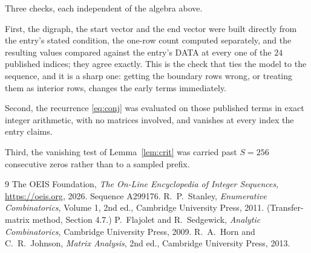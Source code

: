 \documentclass[11pt,a4paper]{article}
\theoremstyle{plain}
\theoremstyle{definition}
\begin{document}
Three checks, each independent of the algebra above.

First, the digraph, the start vector and the end vector were built directly from the
entry's stated condition, the one-row count computed separately, and the resulting values
compared against the entry's DATA at every one of the $24$ published indices; they
agree exactly. This is the check that ties the model to the sequence, and it is a sharp one:
getting the boundary rows wrong, or treating them as interior rows, changes the early terms
immediately.

Second, the recurrence \eqref{eq:conj} was evaluated on those published terms in exact
integer arithmetic, with no matrices involved, and vanishes at every index the entry claims.

Third, the vanishing test of Lemma~\ref{lem:crit} was carried past $S=256$ consecutive
zeros rather than to a sampled prefix.

\begin{thebibliography}{9}
 The OEIS Foundation, \emph{The On-Line Encyclopedia of Integer
Sequences}, \url{https://oeis.org}, 2026. Sequence A299176.
 R.~P.~Stanley, \emph{Enumerative Combinatorics}, Volume 1, 2nd ed.,
Cambridge University Press, 2011. (Transfer-matrix method, Section 4.7.)
 P.~Flajolet and R.~Sedgewick, \emph{Analytic Combinatorics}, Cambridge
University Press, 2009.
 R.~A.~Horn and C.~R.~Johnson, \emph{Matrix Analysis}, 2nd ed., Cambridge
University Press, 2013.
\end{thebibliography}
\end{document}
